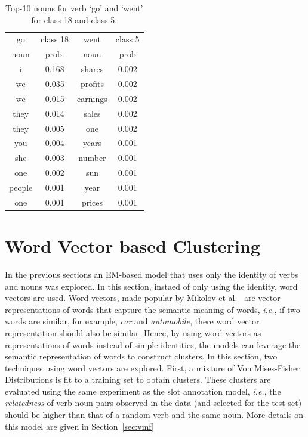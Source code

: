 \documentclass[11pt]{scrartcl}
\newcommand{\ie}{\textit{i.e.}}
\begin{document}
  \begin{table}
    \centering
\begin{tabular}{c c c c}
\toprule
go & class 18 & went & class 5 \\
noun & prob. & noun & prob \\
\midrule
i & 0.168        & shares & 0.002 \\
we & 0.035       & profits & 0.002 \\
we & 0.015       & earnings & 0.002 \\
they & 0.014     & sales & 0.002 \\
they & 0.005     & one & 0.002 \\
you & 0.004      & years & 0.001 \\
she & 0.003      & number & 0.001 \\
one & 0.002      & sun & 0.001 \\
people & 0.001   & year & 0.001 \\
one & 0.001      & prices & 0.001 \\
\bottomrule
\end{tabular}
\caption{Top-10 nouns for verb `go' and `went' for class 18 and class 5.}
\label{table:topnoun}
\end{table}

\section{Word Vector based Clustering} %
In the previous sections an EM-based model that uses only the identity
of verbs and nouns was explored. In this section, instaed of only
using the identity, word vectors are used. Word vectors, made popular
by Mikolov et al.~\cite{mikolov2013efficient} are vector
representations of words that capture the semantic meaning of words,
\ie, if two words are similar, for example, \textit{car} and
\textit{automobile}, there word vector representation should also be
similar. Hence, by using word vectors as representations of words
instead of simple identities, the models can leverage the semantic
representation of words to construct clusters. In this section, two
techniques using word vectors are explored. First, a mixture of Von
Mises-Fisher Distributions is fit to a training set to obtain
clusters. These clusters are evaluated using the same experiment as
the slot annotation model, \ie, the \textit{relatedness} of verb-noun
pairs observed in the data (and selected for the test set) should be
higher than that of a random verb and the same noun. More details on this
model are given in Section~\ref{sec:vmf}
\end{document}
